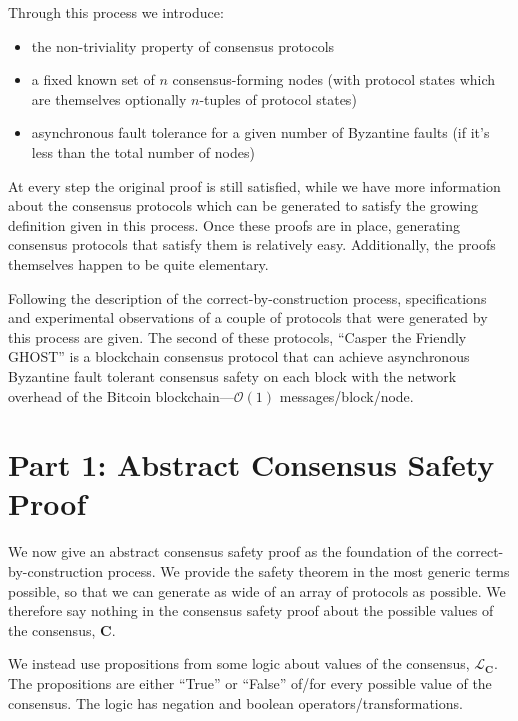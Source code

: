 \documentclass{article}
\theoremstyle{definition}
\newcommand{\cat}{
	\mathbf
}
\begin{document}
Through this process we introduce:

\begin{itemize}
\item the non-triviality property of consensus protocols 
\item a fixed known set of $n$ consensus-forming nodes (with protocol states which are themselves optionally $n$-tuples of protocol states)
\item asynchronous fault tolerance for a given number of Byzantine faults (if it's less than the total number of nodes)
\end{itemize}

At every step the original proof is still satisfied, while we have more information about the consensus protocols which can be generated to satisfy the growing definition given in this process. Once these proofs are in place, generating consensus protocols that satisfy them is relatively easy. Additionally, the proofs themselves happen to be quite elementary.

Following the description of the correct-by-construction process, specifications and experimental observations of a couple of protocols that were generated by this process are given. The second of these protocols, ``Casper the Friendly GHOST'' is a blockchain consensus protocol that can achieve asynchronous Byzantine fault tolerant consensus safety on each block with the network overhead of the Bitcoin blockchain---$\mathcal{O}(1)$ messages/block/node.

\section{Part 1: Abstract Consensus Safety Proof}

We now give an abstract consensus safety proof as the foundation of the correct-by-construction process. We provide the safety theorem in the most generic terms possible, so that we can generate as wide of an array of protocols as possible. We therefore say nothing in the consensus safety proof about the possible values of the consensus, $\cat{C}$.

We instead use propositions from some logic about values of the consensus, $\mathcal{L}_\cat{C}$. The propositions are either ``True'' or ``False'' of/for every possible value of the consensus. The logic has negation and boolean operators/transformations.
\end{document}
